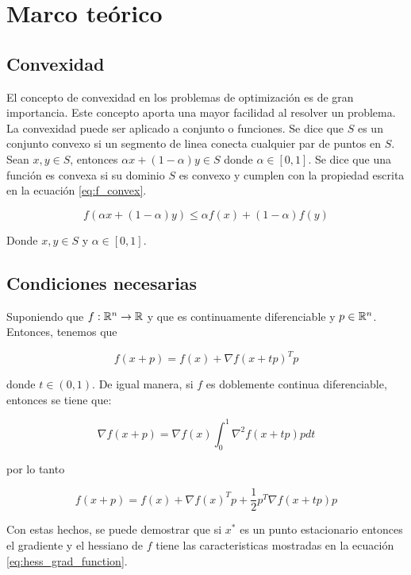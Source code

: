 \section{Marco teórico}

\subsection{Convexidad}

El concepto de convexidad en los problemas de optimización es de gran importancia. Este concepto aporta una mayor facilidad al resolver un problema. La convexidad puede ser aplicado a conjunto o funciones. Se dice que $S$ es un conjunto convexo si un segmento de linea conecta cualquier par de puntos en $S$. Sean $x,y \in S$, entonces $\alpha x + (1-\alpha)y \in S$ donde $\alpha \in [0,1]$. Se dice que una función es convexa si su dominio $S$ es convexo y cumplen con la propiedad escrita en la ecuación \ref{eq:f_convex}.

\begin{equation}
    f(\alpha x + (1-\alpha)y) \leq \alpha f(x) + (1-\alpha)f(y)
    \label{eq:f_convex}
\end{equation}

Donde $x,y \in S$ y $\alpha \in  [0,1]$.

\subsection{Condiciones necesarias}

Suponiendo que $f: \mathbb{R}^n \rightarrow \mathbb{R}$ y que es continuamente diferenciable y $p \in  \mathbb{R}^n$. Entonces, tenemos que

\begin{equation*}
    f(x+p) = f(x) + \nabla f(x+tp)^T p
\end{equation*}

donde $t\in (0,1)$. De igual manera, si $f$ es doblemente continua diferenciable, entonces se tiene que:

\begin{equation*}
    \nabla f(x+p) = \nabla f(x) \int_0^1 \nabla^2 f(x+tp)p dt
\end{equation*}

por lo tanto

\begin{equation*}
    f(x+p) = f(x)+\nabla f(x)^T p + \frac{1}{2}p^T \nabla f(x+tp) p
\end{equation*}

Con estas hechos, se puede demostrar que si $x^*$ es un punto estacionario entonces el gradiente y el hessiano de $f$ tiene las caracteristicas mostradas en la ecuación \ref{eq:hess_grad_function}.

